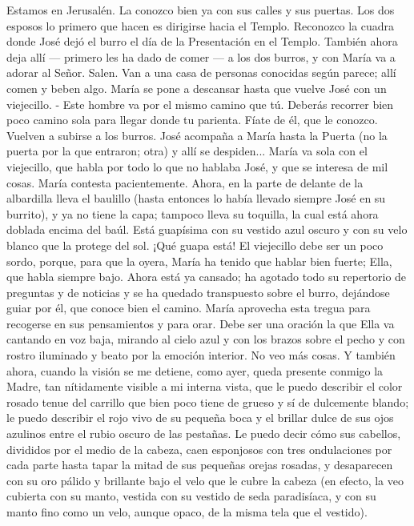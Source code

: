 \documentclass[12pt]{book} %
\begin{document}
Estamos en Jerusalén. La conozco bien ya con sus calles y sus puertas. 
Los dos esposos lo primero que hacen es dirigirse hacia el Templo. Reconozco la cuadra donde José dejó el burro el día de la Presentación en el Templo. También ahora deja allí — primero les ha dado de comer — a los dos burros, y con María va a adorar al Señor. 
Salen. Van a una casa de personas conocidas según parece; allí comen y beben algo. María se pone a descansar hasta 
que vuelve José con un viejecillo. 
- Este hombre va por el mismo camino que tú. Deberás recorrer bien poco camino sola para llegar donde tu parienta. Fíate de él, que le conozco. 
Vuelven a subirse a los burros. José acompaña a María hasta la Puerta (no la puerta por la que entraron; otra) y allí se 
despiden... 
María va sola con el viejecillo, que habla por todo lo que no hablaba José, y que se interesa de mil cosas. María contesta pacientemente. 
Ahora, en la parte de delante de la albardilla lleva el baulillo (hasta entonces lo había llevado siempre José en su 
burrito), y ya no tiene la capa; tampoco lleva su toquilla, la cual está ahora doblada encima del baúl. Está guapísima con su vestido azul oscuro y con su velo blanco que la protege del sol. ¡Qué guapa está! 
El viejecillo debe ser un poco sordo, porque, para que la oyera, María ha tenido que hablar bien fuerte; Ella, que habla siempre bajo. Ahora está ya cansado; ha agotado todo su repertorio de preguntas y de noticias y se ha quedado transpuesto sobre el burro, dejándose guiar por él, que conoce bien el camino. 
María aprovecha esta tregua para recogerse en sus pensamientos y para orar. Debe ser una oración la que Ella va cantando en voz baja, mirando al cielo azul y con los brazos sobre el pecho y con rostro iluminado y beato por la emoción interior. 
No veo más cosas. 
Y también ahora, cuando la visión se me detiene, como ayer, queda presente conmigo la Madre, tan nítidamente visible 
a mi interna vista, que le puedo describir el color rosado tenue del carrillo que bien poco tiene de grueso y sí de dulcemente blando; le puedo describir el rojo vivo de su pequeña boca y el brillar dulce de sus ojos azulinos entre el rubio oscuro de las pestañas. 
Le puedo decir cómo sus cabellos, divididos por el medio de la cabeza, caen esponjosos con tres ondulaciones por cada 
parte hasta tapar la mitad de sus pequeñas orejas rosadas, y desaparecen con su oro pálido y brillante bajo el velo que le cubre la cabeza (en efecto, la veo cubierta con su manto, vestida con su vestido de seda paradisíaca, y con su manto fino como un velo, aunque opaco, de la misma tela que el vestido). 
\end{document}
